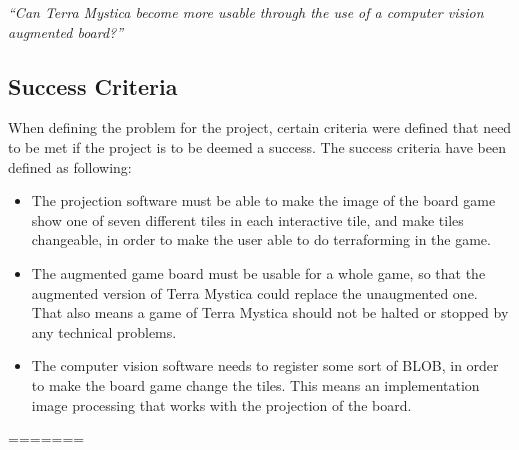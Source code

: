 \textit{“Can Terra Mystica become more usable through the use of a computer vision augmented board?”}

\subsection{Success Criteria}
When defining the problem for the project, certain criteria were defined that need to be met if the project is to be deemed a success. The success criteria have been defined as following:

\begin{itemize}
	\item The projection software must be able to make the image of the board game show one of seven different tiles in each interactive tile, and make tiles changeable, in order to make the user able to do terraforming in the game.
	\item The augmented game board must be usable for a whole game, so that the augmented version of Terra Mystica could replace the unaugmented one. That also means a game of Terra Mystica should not be halted or stopped by any technical problems.
	\item The computer vision software needs to register some sort of BLOB, in order to make the board game change the tiles. This means an implementation image processing that works with the projection of the board.
\end{itemize} 
=======

